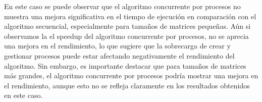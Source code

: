 En este caso se puede observar que el algoritmo concurrente por procesos no muestra una mejora significativa en el tiempo de ejecución en comparación con el algoritmo secuencial, especialmente para tamaños de matrices pequeñas. Aún si observamos la el speedup del algoritmo concurrente por procesos, no se aprecia una mejora en el rendimiento, lo que sugiere que la sobrecarga de crear y gestionar procesos puede estar afectando negativamente el rendimiento del algoritmo. Sin embargo, es importante destacar que para tamaños de matrices más grandes, el algoritmo concurrente por procesos podría mostrar una mejora en el rendimiento, aunque esto no se refleja claramente en los resultados obtenidos en este caso.